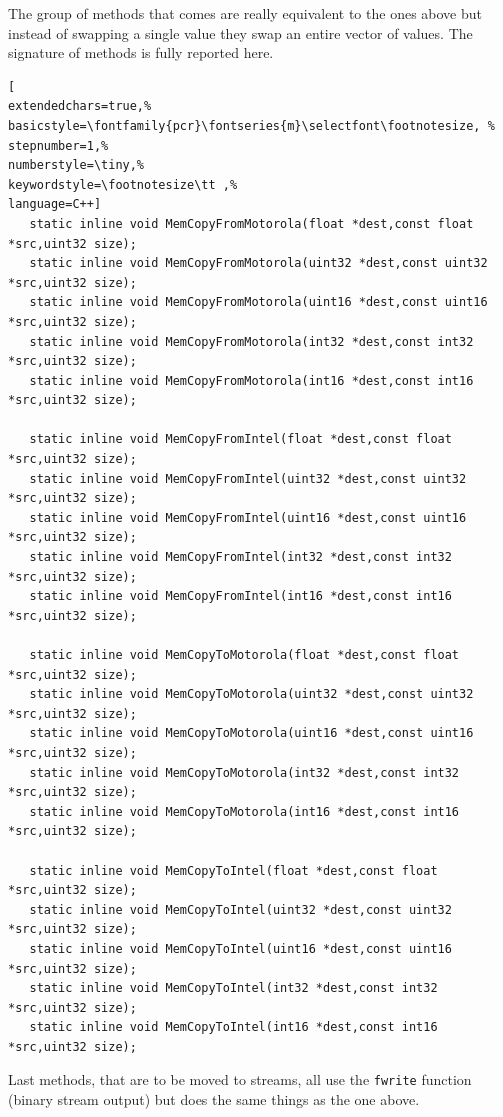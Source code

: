 The group of methods that comes are really equivalent to the ones above but instead of swapping a single value they swap an entire vector of values. The signature of methods is fully reported here.

\begin{lstlisting}[
extendedchars=true,%
basicstyle=\fontfamily{pcr}\fontseries{m}\selectfont\footnotesize, %
stepnumber=1,%
numberstyle=\tiny,%
keywordstyle=\footnotesize\tt ,%
language=C++]
   static inline void MemCopyFromMotorola(float *dest,const float *src,uint32 size);
   static inline void MemCopyFromMotorola(uint32 *dest,const uint32 *src,uint32 size);
   static inline void MemCopyFromMotorola(uint16 *dest,const uint16 *src,uint32 size);
   static inline void MemCopyFromMotorola(int32 *dest,const int32 *src,uint32 size);
   static inline void MemCopyFromMotorola(int16 *dest,const int16 *src,uint32 size);

   static inline void MemCopyFromIntel(float *dest,const float *src,uint32 size);
   static inline void MemCopyFromIntel(uint32 *dest,const uint32 *src,uint32 size);
   static inline void MemCopyFromIntel(uint16 *dest,const uint16 *src,uint32 size);
   static inline void MemCopyFromIntel(int32 *dest,const int32 *src,uint32 size);
   static inline void MemCopyFromIntel(int16 *dest,const int16 *src,uint32 size);

   static inline void MemCopyToMotorola(float *dest,const float *src,uint32 size);
   static inline void MemCopyToMotorola(uint32 *dest,const uint32 *src,uint32 size);
   static inline void MemCopyToMotorola(uint16 *dest,const uint16 *src,uint32 size);
   static inline void MemCopyToMotorola(int32 *dest,const int32 *src,uint32 size);
   static inline void MemCopyToMotorola(int16 *dest,const int16 *src,uint32 size);

   static inline void MemCopyToIntel(float *dest,const float *src,uint32 size);
   static inline void MemCopyToIntel(uint32 *dest,const uint32 *src,uint32 size);
   static inline void MemCopyToIntel(uint16 *dest,const uint16 *src,uint32 size);
   static inline void MemCopyToIntel(int32 *dest,const int32 *src,uint32 size);
   static inline void MemCopyToIntel(int16 *dest,const int16 *src,uint32 size);
\end{lstlisting}

Last methods, that are to be moved to streams, all use the \texttt{fwrite} function (binary stream output) but does the same things as the one above.

